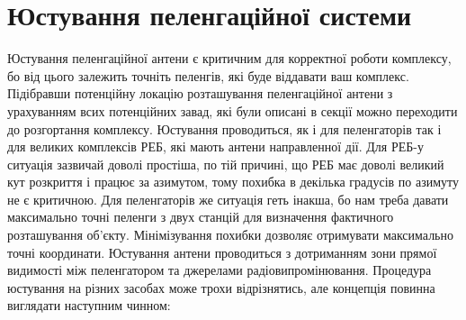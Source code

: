 \documentclass{article}
\begin{document}
\section{Юстування пеленгаційної системи}

Юстування пеленгаційної антени є критичним для корректної роботи комплексу, бо від цього залежить точніть пеленгів, які буде віддавати ваш комплекс. Підібравши потенційну локацію розташування пеленгаційної антени з урахуванням всих потенційних завад, які були описані в секції  можно переходити до розгортання комплексу. Юстування проводиться, як і для пеленгаторів так і для великих комплексів РЕБ, які мають антени направленної дії. Для РЕБ-у ситуація зазвичай доволі простіша, по тій причині, що РЕБ має доволі великий кут розкриття і працює за азимутом, тому похибка в декілька градусів по азимуту не є критичною. Для пеленгаторів же ситуація геть інакша, бо нам треба давати максимально точні пеленги з двух станцій для визначення фактичного розташування об'єкту. Мінімізування похибки дозволяє отримувати максимально точні координати. Юстування антени проводиться з дотриманням зони прямої видимості між пеленгатором та джерелами радіовипромінювання. Процедура юстування на різних засобах може трохи відрізнятись, але концепція повинна виглядати наступним чинном:
\end{document}

